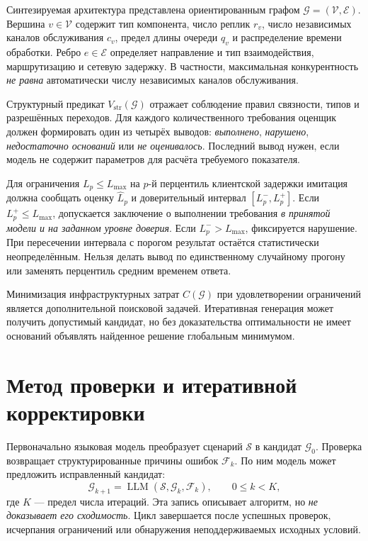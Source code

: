 Синтезируемая архитектура представлена ориентированным графом $\mathcal{G}=(\mathcal{V},\mathcal{E})$. Вершина $v\in\mathcal{V}$ содержит тип компонента, число реплик $r_v$, число независимых каналов обслуживания $c_v$, предел длины очереди $q_v$ и распределение времени обработки. Ребро $e\in\mathcal{E}$ определяет направление и тип взаимодействия, маршрутизацию и сетевую задержку. В частности, максимальная конкурентность \emph{не равна} автоматически числу независимых каналов обслуживания.

Структурный предикат $V_{\mathrm{str}}(\mathcal{G})$ отражает соблюдение правил связности, типов и разрешённых переходов. Для каждого количественного требования оценщик должен формировать один из четырёх выводов: \textit{выполнено}, \textit{нарушено}, \textit{недостаточно оснований} или \textit{не оценивалось}. Последний вывод нужен, если модель не содержит параметров для расчёта требуемого показателя.

Для ограничения $L_p\leq L_{\max}$ на $p$-й перцентиль клиентской задержки имитация должна сообщать оценку $\widehat{L}_p$ и доверительный интервал $[L_p^-,L_p^+]$. Если $L_p^+\leq L_{\max}$, допускается заключение о выполнении требования \emph{в принятой модели и на заданном уровне доверия}. Если $L_p^->L_{\max}$, фиксируется нарушение. При пересечении интервала с порогом результат остаётся статистически неопределённым. Нельзя делать вывод по единственному случайному прогону или заменять перцентиль средним временем ответа.

Минимизация инфраструктурных затрат $C(\mathcal{G})$ при удовлетворении ограничений является дополнительной поисковой задачей. Итеративная генерация может получить допустимый кандидат, но без доказательства оптимальности не имеет оснований объявлять найденное решение глобальным минимумом.

\section{Метод проверки и итеративной корректировки}

Первоначально языковая модель преобразует сценарий $\mathcal{S}$ в кандидат $\mathcal{G}_0$. Проверка возвращает структурированные причины ошибок $\mathcal{F}_k$. По ним модель может предложить исправленный кандидат:
\begin{equation}
\mathcal{G}_{k+1}=\operatorname{LLM}(\mathcal{S},\mathcal{G}_k,\mathcal{F}_k),
\qquad 0\leq k<K,
\end{equation}
где $K$ --- предел числа итераций. Эта запись описывает алгоритм, но \emph{не доказывает его сходимость}. Цикл завершается после успешных проверок, исчерпания ограничений или обнаружения неподдерживаемых исходных условий.

